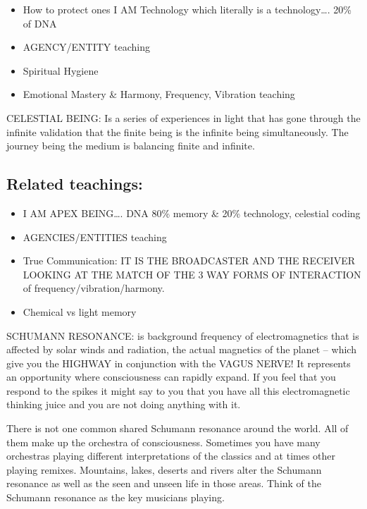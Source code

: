 \begin{itemize}
\item
  How to protect ones I AM Technology which literally is a
  technology\ldots{}. 20\% of DNA
\item
  AGENCY/ENTITY teaching
\item
  Spiritual Hygiene
\item
  Emotional Mastery \& Harmony, Frequency, Vibration teaching
\end{itemize}

CELESTIAL BEING: Is a series of experiences in light that has gone
through the infinite validation that the finite being is the infinite
being simultaneously. The journey being the medium is balancing finite
and infinite.

\subsection{Related teachings:}\label{related-teachings-3}

\begin{itemize}
\item
  I AM APEX BEING\ldots{}. DNA 80\% memory \& 20\% technology, celestial
  coding
\item
  AGENCIES/ENTITIES teaching
\item
  True Communication: IT IS THE BROADCASTER AND THE RECEIVER LOOKING AT
  THE MATCH OF THE 3 WAY FORMS OF INTERACTION of
  frequency/vibration/harmony.
\item
  Chemical vs light memory
\end{itemize}

SCHUMANN RESONANCE: is background frequency of electromagnetics that is
affected by solar winds and radiation, the actual magnetics of the
planet -- which give you the HIGHWAY in conjunction with the VAGUS
NERVE! It represents an opportunity where consciousness can rapidly
expand. If you feel that you respond to the spikes it might say to you
that you have all this electromagnetic thinking juice and you are not
doing anything with it.

There is not one common shared Schumann resonance around the world. All
of them make up the orchestra of consciousness. Sometimes you have many
orchestras playing different interpretations of the classics and at
times other playing remixes. Mountains, lakes, deserts and rivers alter
the Schumann resonance as well as the seen and unseen life in those
areas. Think of the Schumann resonance as the key musicians playing.

